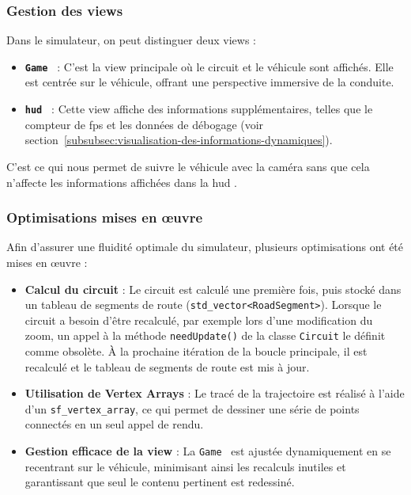 \subsubsection{Gestion des \glspl{view}}\label{subsubsec:gestion-des-vues}
Dans le simulateur, on peut distinguer deux \glspl{view} :
\begin{itemize}
    \item \textbf{\texttt{Game }} : C'est la \gls{view} principale où le circuit et le véhicule sont affichés.
    Elle est centrée sur le véhicule, offrant une perspective immersive de la conduite.
    \item \textbf{\texttt{\gls{hud} }} : Cette \gls{view} affiche des informations supplémentaires, telles que le compteur de \gls{fps} et les données de débogage (voir section~\ref{subsubsec:visualisation-des-informations-dynamiques}).
\end{itemize}

C'est ce qui nous permet de suivre le véhicule avec la \og caméra \fg{} sans que cela n'affecte les informations affichées dans la \gls{hud} .

\subsubsection{Optimisations mises en œuvre}\label{subsubsec:optimisations-mises-en-oeuvre}
Afin d'assurer une fluidité optimale du simulateur, plusieurs optimisations ont été mises en œuvre :
\begin{itemize}
    \item \textbf{Calcul du circuit} : Le circuit est calculé une première fois, puis stocké dans un tableau de segments de route (\texttt{\gls{std_vector}<RoadSegment>}\cite{cpp_reference_vector}).
    Lorsque le circuit a besoin d'être recalculé, par exemple lors d'une modification du zoom, un appel à la méthode \texttt{needUpdate()} de la classe \texttt{Circuit} le définit comme obsolète.
    À la prochaine itération de la boucle principale, il est recalculé et le tableau de segments de route est mis à jour.
    \item \textbf{Utilisation de Vertex Arrays} : Le tracé de la trajectoire est réalisé à l'aide d'un \texttt{\gls{sf_vertex_array}}\cite{sfml_sf_vertexarray}, ce qui permet de dessiner une série de points connectés en un seul appel de rendu.
    \item \textbf{Gestion efficace de la \gls{view}} : La \texttt{Game } est ajustée dynamiquement en se recentrant sur le véhicule, minimisant ainsi les recalculs inutiles et garantissant que seul le contenu pertinent est redessiné.
\end{itemize}

